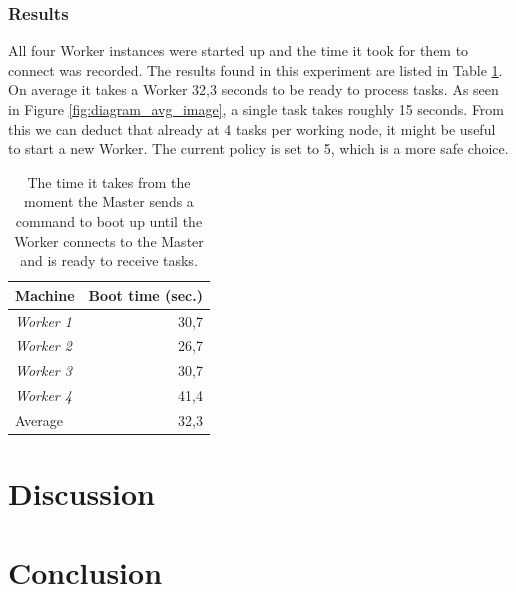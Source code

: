\documentclass{acm_proc_article-sp}
\begin{document}
\subsubsection{Results}
All four Worker instances were started up and the time it took for them to connect was recorded.
The results found in this experiment are listed in Table \ref{tbl:boottimes}.
On average it takes a Worker 32,3 seconds to be ready to process tasks.
As seen in Figure \ref{fig:diagram_avg_image}, a single task takes roughly 15 seconds. 
From this we can deduct that already at 4 tasks per working node, it might be useful to start a new Worker.
The current policy is set to 5, which is a more safe choice.

\begin{table}
	\centering
	\begin{tabular}{| l | r |}
		\hline
		Machine & Boot time (sec.) \\ \hline \hline
		\emph{Worker 1} & 30,7 \\ \hline
		\emph{Worker 2} & 26,7 \\ \hline
		\emph{Worker 3} & 30,7 \\ \hline
		\emph{Worker 4} & 41,4 \\ \hline \hline
		Average & 32,3 \\ \hline
	\end{tabular}
	\caption{The time it takes from the moment the Master sends a command to boot up until the Worker connects to the Master and is ready to receive tasks.}
	\label{tbl:boottimes}
\end{table}


\section{Discussion}
\label{sec:discussion}



\section{Conclusion}
\label{sec:conclusion}
\end{document}
